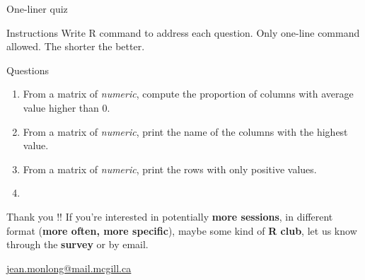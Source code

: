 \documentclass[10pt]{beamer}
\begin{document}
\begin{frame}{One-liner quiz}
  \begin{block}{Instructions}
    Write R command to address each question. Only one-line command allowed. The shorter the better.
  \end{block}
  \begin{block}{Questions}
    \begin{enumerate}
    \item From a {\sf matrix} of {\it numeric}, compute the proportion of columns with average value higher than 0.
    \item From a {\sf matrix} of {\it numeric}, print the name of the columns with the highest value.
    \item From a {\sf matrix} of {\it numeric}, print the rows with only positive values.
    \item 
    \end{enumerate}
  \end{block}
\end{frame}



\begin{frame}{Thank you !!}
  \centering
  If you're interested in potentially {\bf more sessions}, in different format ({\bf more often, more specific}), maybe some kind of {\bf R club}, let us know through the {\bf survey} or by email.

  \bigskip
  \bigskip

  \uline{\href{mailto:jean.monlong@mail.mcgill.ca}{jean.monlong@mail.mcgill.ca}}
\end{frame}
\end{document}
